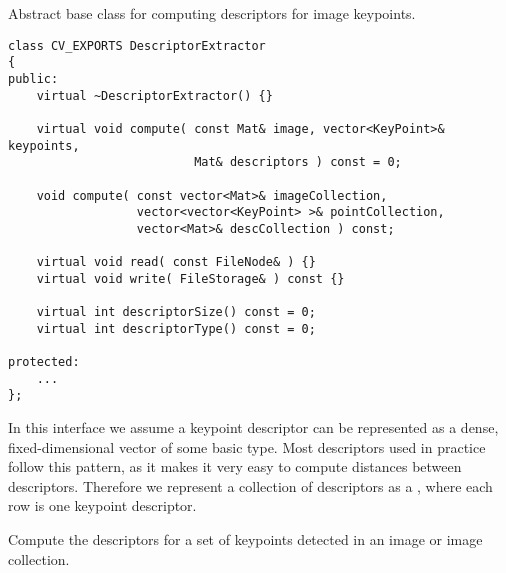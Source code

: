 Abstract base class for computing descriptors for image keypoints.

\begin{lstlisting}
class CV_EXPORTS DescriptorExtractor
{
public:
    virtual ~DescriptorExtractor() {}
    
    virtual void compute( const Mat& image, vector<KeyPoint>& keypoints,
                          Mat& descriptors ) const = 0;

    void compute( const vector<Mat>& imageCollection, 
                  vector<vector<KeyPoint> >& pointCollection, 
                  vector<Mat>& descCollection ) const;

    virtual void read( const FileNode& ) {}
    virtual void write( FileStorage& ) const {}

    virtual int descriptorSize() const = 0;
    virtual int descriptorType() const = 0;

protected:
    ...
};
\end{lstlisting}

In this interface we assume a keypoint descriptor can be represented as a
dense, fixed-dimensional vector of some basic type. Most descriptors used
in practice follow this pattern, as it makes it very easy to compute
distances between descriptors. Therefore we represent a collection of
descriptors as a , where each row is one keypoint descriptor.

Compute the descriptors for a set of keypoints detected in an image or image collection.


\begin{description}
\end{description}

